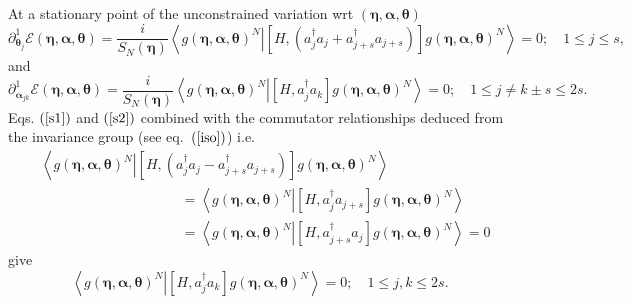 \documentclass[aps,preprint]{revtex4}%
\begin{document}
At a stationary point of the unconstrained variation wrt $\left(
\bm{\eta},\bm{\alpha},\bm{\theta}\right)  $
\begin{equation}
\partial_{\bm{\theta}_{j}}^{1}\mathcal{E}\left(
\bm{\eta },\bm{\alpha},\bm{\theta}\right)  =\frac{i}{S_{N}\left(
\bm{\eta}\right)  }\left\langle \left.  g\left(
\bm{\eta },\bm{\alpha},\bm{\theta}\right)  ^{N}\right\vert \left[  H,\left(
a_{j}^{\dagger}a_{j}+a_{j+s}^{\dagger}a_{j+s}\right)  \right]  g\left(
\bm{\eta},\bm{\alpha},\bm{\theta}\right)  ^{N}\right\rangle =0;\quad1\leq
j\leq s, \label{s1}%
\end{equation}
and%
\begin{equation}
\partial_{\bm{\alpha}_{jk}}^{1}\mathcal{E}\left(
\bm{\eta },\bm{\alpha},\bm{\theta}\right)  =\frac{i}{S_{N}\left(
\bm{\eta}\right)  }\left\langle \left.  g\left(
\bm{\eta },\bm{\alpha},\bm{\theta}\right)  ^{N}\right\vert \left[
H,a_{j}^{\dagger}a_{k}\right]  g\left(
\bm{\eta},\bm{\alpha },\bm{\theta}\right)  ^{N}\right\rangle =0;\quad1\leq
j\neq k\pm s\leq2s. \label{s2}%
\end{equation}
Eqs. $\left(  \ref{s1}\right)  $ and $\left(  \ref{s2}\right)  $ combined with
the commutator relationships deduced from the invariance group (see
eq.\ $\left(  \ref{iso}\right)  $) i.e.\
\begin{align}
&  \left\langle \left.  g\left(  \bm{\eta},\bm{\alpha},\bm{\theta }\right)
^{N}\right\vert \left[  H,\left(  a_{j}^{\dagger}a_{j}-a_{j+s}^{\dagger
}a_{j+s}\right)  \right]  g\left(  \bm{\eta },\bm{\alpha},\bm{\theta}\right)
^{N}\right\rangle \nonumber\\
&  \qquad\qquad\qquad\qquad\qquad\left.  =\right.  \left\langle \left.
g\left(  \bm{\eta},\bm{\alpha},\bm{\theta}\right)  ^{N}\right\vert \left[
H,a_{j}^{\dagger}a_{j+s}\right]  g\left(
\bm{\eta },\bm{\alpha},\bm{\theta}\right)  ^{N}\right\rangle \nonumber\\
&  \qquad\qquad\qquad\qquad\qquad\left.  =\right.  \left\langle \left.
g\left(  \bm{\eta},\bm{\alpha},\bm{\theta}\right)  ^{N}\right\vert \left[
H,a_{j+s}^{\dagger}a_{j}\right]  g\left(
\bm{\eta },\bm{\alpha},\bm{\theta}\right)  ^{N}\right\rangle \left.
=\right.  0
\end{align}
give
\begin{equation}
\left\langle \left.  g\left(  \bm{\eta},\bm{\alpha},\bm{\theta }\right)
^{N}\right\vert \left[  H,a_{j}^{\dagger}a_{k}\right]  g\left(
\bm{\eta},\bm{\alpha},\bm{\theta}\right)  ^{N}\right\rangle =0;\quad1\leq
j,k\leq2s. \label{s3}%
\end{equation}
\end{document}
